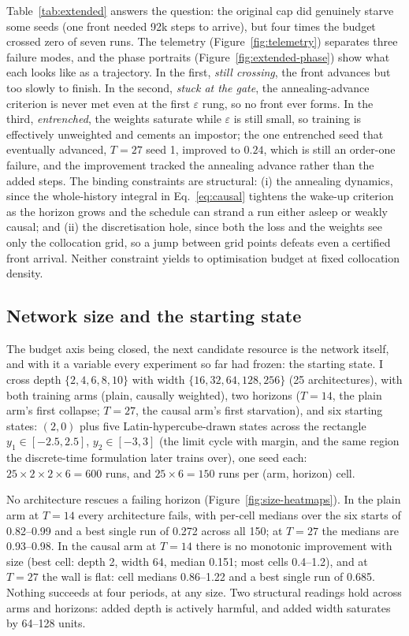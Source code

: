 \documentclass[11pt,a4paper]{article}
\begin{document}
Table~\ref{tab:extended} answers the question: the original cap did
genuinely starve some seeds (one front needed 92k steps to arrive), but
four times the budget crossed zero of seven runs. The telemetry
(Figure~\ref{fig:telemetry}) separates three failure modes, and the phase
portraits (Figure~\ref{fig:extended-phase}) show what each looks like as a
trajectory. In the first, \emph{still crossing}, the front advances but
too slowly to finish. In the second, \emph{stuck at the gate}, the
annealing-advance criterion is never met even at the first $\varepsilon$
rung, so no front ever forms. In the third, \emph{entrenched}, the
weights saturate while $\varepsilon$ is still small, so training is
effectively unweighted and cements an impostor; the one entrenched seed
that eventually advanced, $T=27$ seed 1, improved to $0.24$, which is
still an order-one failure, and the improvement tracked the annealing
advance rather than the added steps. The binding constraints are
structural: (i) the annealing dynamics, since the whole-history integral
in Eq.~\eqref{eq:causal} tightens the wake-up criterion as the horizon
grows and the schedule can strand a run either asleep or weakly causal;
and (ii) the discretisation hole, since both the loss and the weights
see only the collocation grid, so a jump between grid points defeats even
a certified front arrival. Neither constraint yields to optimisation
budget at fixed collocation density.

\subsection{Network size and the starting state}
\label{sec:size-start}

The budget axis being closed, the next candidate resource is the network
itself, and with it a variable every experiment so far had frozen: the
starting state. I cross depth $\{2,4,6,8,10\}$ with width
$\{16,32,64,128,256\}$ (25 architectures), with both training arms
(plain, causally weighted), two horizons ($T=14$, the plain arm's first
collapse; $T=27$, the causal arm's first starvation), and six starting
states: $(2,0)$ plus five Latin-hypercube-drawn states across the
rectangle $y_1 \in [-2.5, 2.5]$, $y_2 \in [-3, 3]$ (the limit cycle with
margin, and the same region the discrete-time formulation later trains
over), one seed each: $25 \times 2 \times 2 \times 6 = 600$ runs, and
$25 \times 6 = 150$ runs per (arm, horizon) cell.

No architecture rescues a failing horizon
(Figure~\ref{fig:size-heatmaps}). In the plain arm at $T=14$ every
architecture fails, with per-cell medians over the six starts of
0.82--0.99 and a best single run of 0.272 across all 150; at $T=27$ the
medians are 0.93--0.98. In the causal arm at $T=14$ there is no monotonic
improvement with size (best cell: depth 2, width 64, median 0.151; most
cells 0.4--1.2), and at $T=27$ the wall is flat: cell medians 0.86--1.22
and a best single run of 0.685. Nothing succeeds at four periods, at any
size. Two structural readings hold across arms and horizons: added depth
is actively harmful, and added width saturates by 64--128 units.
\end{document}
